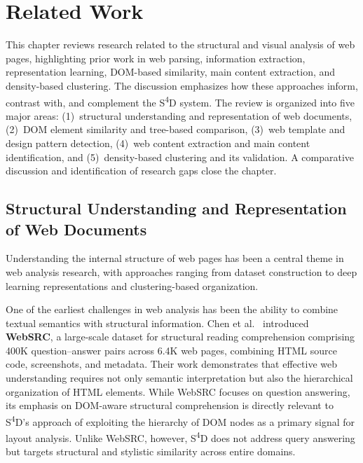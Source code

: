 \chapter{Related Work}
\label{ch:related-work}

This chapter reviews research related to the structural and visual analysis of web pages, highlighting prior work in web parsing, information extraction, representation learning, DOM-based similarity, main content extraction, and density-based clustering. The discussion emphasizes how these approaches inform, contrast with, and complement the S\textsuperscript{4}D system. The review is organized into five major areas: (1)~structural understanding and representation of web documents, (2)~DOM element similarity and tree-based comparison, (3)~web template and design pattern detection, (4)~web content extraction and main content identification, and (5)~density-based clustering and its validation. A comparative discussion and identification of research gaps close the chapter.

\section{Structural Understanding and Representation of Web Documents}
\label{sec:structural-understanding}

Understanding the internal structure of web pages has been a central theme in web analysis research, with approaches ranging from dataset construction to deep learning representations and clustering-based organization.

One of the earliest challenges in web analysis has been the ability to combine textual semantics with structural information. Chen et al.~\cite{chen2021websrc} introduced \textbf{WebSRC}, a large-scale dataset for structural reading comprehension comprising 400K question--answer pairs across 6.4K web pages, combining HTML source code, screenshots, and metadata. Their work demonstrates that effective web understanding requires not only semantic interpretation but also the hierarchical organization of HTML elements. While WebSRC focuses on question answering, its emphasis on DOM-aware structural comprehension is directly relevant to S\textsuperscript{4}D's approach of exploiting the hierarchy of DOM nodes as a primary signal for layout analysis. Unlike WebSRC, however, S\textsuperscript{4}D does not address query answering but targets structural and stylistic similarity across entire domains.

